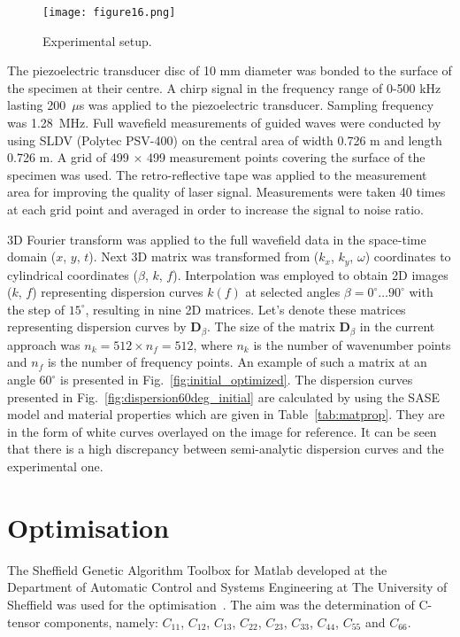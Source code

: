 \documentclass[preprint,12pt]{elsarticle}
\newcommand{\matr}[1]{\mathbf{#1}} %
\begin{document}
	\begin{figure} [h!]
	\centering
	\texttt{[image: figure16.png]}
	\caption{Experimental setup.}
	\label{fig:setup}
\end{figure}
The piezoelectric transducer disc of 10 mm diameter was bonded to the surface of the specimen at their centre. 
A chirp signal in the frequency range of 0-500 kHz lasting 200~\(\mu\)s was applied to the piezoelectric transducer. 
Sampling frequency was 1.28~MHz. Full wavefield measurements of guided waves were conducted by using SLDV (Polytec PSV-400) on the central area of width 0.726 m and length 0.726 m. 
A grid of 499 \(\times\) 499 measurement points covering the surface of the specimen was used. 
The retro-reflective tape was applied to the measurement area for improving the quality of laser signal. 
Measurements were taken 40 times at each grid point and averaged in order to increase the signal to noise ratio.

3D Fourier transform was applied to the full wavefield data in the space-time domain 
(\(x\), \(y\), \(t\)).
 Next 3D matrix was transformed from (\(k_x\), \(k_y\), \(\omega\)) coordinates to cylindrical coordinates (\(\beta\), \(k\), \(f\)). 
Interpolation was employed to obtain 2D images (\(k\), \(f\)) representing dispersion curves \(k(f)\) at selected angles \(\beta = 0^{\circ} \ldots 90^{\circ}\) with the step of \(15^{\circ}\), resulting in nine 2D matrices. 
Let's denote these matrices representing dispersion curves by \(\matr{D}_{\beta}\). The size of the matrix  \(\matr{D}_{\beta}\) in the current approach was \(n_k=512 \times n_f= 512\), where \(n_k\) is the number of wavenumber points 
and \(n_f\) is the number of frequency points.  
An example of such a matrix at an angle \(60^{\circ}\) is presented in Fig.~\ref{fig:initial_optimized}. 
The dispersion curves presented in Fig.~\ref{fig:dispersion60deg_initial} are calculated by using the SASE model and material properties which are given in Table~\ref{tab:matprop}.
They are in the form of white curves overlayed on the image for reference. 
It can be seen that there is a high discrepancy between semi-analytic dispersion curves and the experimental one. 
	\section{Optimisation \label{sec:optimization}}
	The Sheffield Genetic Algorithm Toolbox for Matlab developed at the Department of Automatic Control and Systems Engineering at The University of Sheffield was used for the optimisation~\cite{Chipperfield1994}.
	The aim was the determination of C-tensor components, namely: \(C_{11}\), \(C_{12}\), \(C_{13}\),  \(C_{22}\), \(C_{23}\), \(C_{33}\), \(C_{44}\), \(C_{55}\) and \(C_{66}\).
\end{document}

